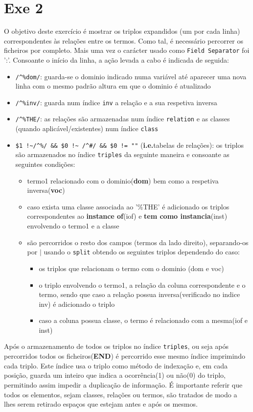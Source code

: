 \documentclass{llncs}
\begin{document}
\section{Exe 2}
O objetivo deste exercício é mostrar os triplos expandidos (um por cada linha) correspondentes às relações entre os termos. Como tal, é necessário percorrer os ficheiros por completo. Mais uma vez o carácter usado como \texttt{Field Separator} foi ':'. Consoante o início da linha, a ação levada a cabo é indicada de seguida:
\begin{itemize}
    \item \verb|/^%dom/|: guarda-se o dominio indicado numa variável até aparecer uma nova linha com o mesmo padrão altura em que o dominio é atualizado
    \item \verb|/^%inv/|: guarda num índice \texttt{inv} a relação e a sua respetiva inversa
    \item \verb|/^%THE/|: as relações são armazenadas num índice \texttt{relation} e as classes (quando aplicável/existentes) num índice \texttt{class}
    \item \verb|$1 !~/^%/ && $0 !~ /^#/ && $0 != ""| (\textbf{i.e.}tabelas de relações): os triplos são armazenados no índice \texttt{triples} da seguinte maneira e consoante as seguintes condições: 
        \begin{itemize}
            \item termo1 relacionado com o dominio(\textbf{dom}) bem como a respetiva inversa(\textbf{voc})
            \item caso exista uma classe associada ao '\%THE' é adicionado os triplos correspondentes ao \textbf{instance of}(iof) e \textbf{tem como instancia}(inst) envolvendo o termo1 e a classe
            \item são percorridos o resto dos campos (termos da lado direito), separando-os por $|$ usando o \texttt{split} obtendo os seguintes triplos dependendo do caso:
                \begin{itemize}
                    \item os triplos que relacionam o termo com o dominio (dom e voc)
                    \item o triplo envolvendo o termo1, a relação da coluna correspondente e o termo, sendo que caso a relação possua inversa(verificado no indice inv) é adicionado o triplo
                    \item caso a coluna possua classe, o termo é relacionado com a mesma(iof e inst)
                \end{itemize}
        \end{itemize}
\end{itemize}
Após o armazenamento de todos os triplos no índice \texttt{triples}, ou seja após percorridos todos os ficheiros(\textbf{END}) é percorrido esse mesmo índice imprimindo cada triplo. Este índice usa o triplo como método de indexação e, em cada posição, guarda um inteiro que indica a ocorrência(1)  ou não(0) do triplo, permitindo assim impedir a duplicação de informação. É importante referir que todos os elementos, sejam classes, relações ou termos, são tratados de modo a lhes serem retirado espaços que estejam antes e após os mesmos.
\end{document}
